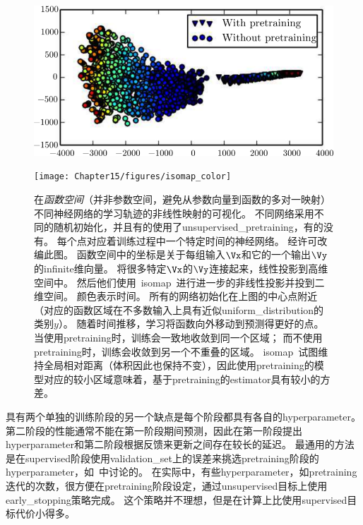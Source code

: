 

\begin{figure}[!htb]
\ifOpenSource
\centerline{\includegraphics[scale=0.5]{images/128.png}}
\else
\centerline{\texttt{[image: Chapter15/figures/isomap\_color]}}
\fi
\caption{在\emph{函数空间}（并非参数空间，避免从参数向量到函数的多对一映射）不同神经网络的学习轨迹的非线性映射的可视化。
不同网络采用不同的随机初始化，并且有的使用了\gls{unsupervised_pretraining}，有的没有。
每个点对应着训练过程中一个特定时间的神经网络。
经\citet{Erhan+al-2010-small}许可改编此图。
函数空间中的坐标是关于每组输入$\Vx$和它的一个输出$\Vy$的\gls{infinite}维向量。
\cite{Erhan+al-2010-small}将很多特定$\Vx$的$\Vy$连接起来，线性投影到高维空间中。
然后他们使用~\gls{isomap}~\citep{Tenenbaum2000-isomap}进行进一步的非线性投影并投到二维空间。
颜色表示时间。
所有的网络初始化在上图的中心点附近（对应的函数区域在不多数输入上具有近似\gls{uniform_distribution}的类别$y$）。
随着时间推移，学习将函数向外移动到预测得更好的点。
当使用\gls{pretraining}时，训练会一致地收敛到同一个区域；
而不使用\gls{pretraining}时，训练会收敛到另一个不重叠的区域。
\gls{isomap}~试图维持全局相对距离（体积因此也保持不变），因此使用\gls{pretraining}的模型对应的较小区域意味着，基于\gls{pretraining}的\gls{estimator}具有较小的方差。
}
\label{fig:chap15_isomap}
\end{figure}



具有两个单独的训练阶段的另一个缺点是每个阶段都具有各自的\gls{hyperparameter}。
第二阶段的性能通常不能在第一阶段期间预测，因此在第一阶段提出\gls{hyperparameter}和第二阶段根据反馈来更新之间存在较长的延迟。
最通用的方法是在\gls{supervised}阶段使用\gls{validation_set}上的误差来挑选\gls{pretraining}阶段的\gls{hyperparameter}，如~\cite{Larochelle-jmlr-2009}中讨论的。
在实际中，有些\gls{hyperparameter}，如\gls{pretraining}迭代的次数，很方便在\gls{pretraining}阶段设定，通过\gls{unsupervised}目标上使用\gls{early_stopping}策略完成。
这个策略并不理想，但是在计算上比使用\gls{supervised}目标代价小得多。

